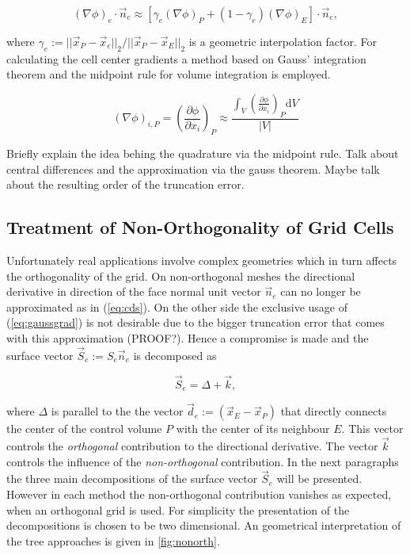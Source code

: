    \begin{displaymath}
      \left(\nabla \phi\right)_e \cdot \vec{n}_e 
      \approx 
      \left[\gamma_e \left(\nabla \phi \right)_P + (1-\gamma_e) \left(\nabla \phi \right)_E \right] \cdot \vec{n}_e,
    \end{displaymath}

    where \( \gamma_e := {||\vec{x}_P - \vec{x}_e||_2}/{||\vec{x}_P - \vec{x}_E||_2}\) is a geometric interpolation factor. For calculating the cell center gradients a method based on Gauss' integration theorem and the midpoint rule for volume integration is employed.

    \begin{equation}
      \label{eq:gaussgrad}
      \left( \nabla \phi \right)_{i,P}
      =
      \left( \frac{\partial \phi}{\partial x_i}\right)_P
      \approx
      \frac{\int_V\left(\frac{\partial \phi}{\partial x_i}\right)_P\mathrm{d}V}{|V|}
    \end{equation}

    Briefly explain the idea behing the quadrature via the midpoint rule. Talk about central differences and the approximation via the gauss theorem. Maybe talk about the resulting order of the truncation error. 

    \subsection{Treatment of Non-Orthogonality of Grid Cells}

    Unfortunately real applications involve complex geometries which in turn affects the orthogonality of the grid. On non-orthogonal meshes the directional derivative in direction of the face normal unit vector \(\vec{n}_e\) can no longer be approximated as in (\ref{eq:cds}). On the other side the exclusive usage of (\ref{eq:gaussgrad}) is not desirable due to the bigger truncation error that comes with this approximation (PROOF?). Hence a compromise is made and the surface vector \(\vec{S}_e := S_e \vec{n}_e\) is decomposed as

    \begin{equation}
      \vec{S}_e = \Delta + \vec{k},
    \end{equation}

    where \(\Delta\) is parallel to the the vector \(\vec{d}_e := \left(\vec{x}_E - \vec{x}_P\right)\) that directly connects the center of the control volume \(P\) with the center of its neighbour \(E\). This vector controls the \textit{orthogonal} contribution to the directional derivative. The vector \(\vec{k}\) controls the influence of the \textit{non-orthogonal} contribution. In the next paragraphs the three main decompositions of the surface vector \(\vec{S}_e\) will be presented. However in each method the non-orthogonal contribution vanishes as expected, when an orthogonal grid is used. For simplicity the presentation of the decompositions is chosen to be two dimensional. An geometrical interpretation of the tree approaches is given in \ref{fig:nonorth}.


